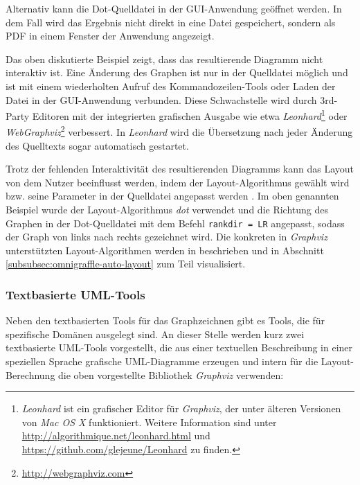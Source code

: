 Alternativ kann die Dot-Quelldatei in der GUI-Anwendung geöffnet werden. In dem Fall wird das Ergebnis nicht direkt in eine Datei gespeichert, sondern als PDF in einem Fenster der Anwendung angezeigt.

Das oben diskutierte Beispiel zeigt, dass das resultierende Diagramm nicht interaktiv ist. Eine Änderung des Graphen ist nur in der Quelldatei möglich und ist mit einem wiederholten Aufruf des Kommandozeilen-Tools oder Laden der Datei in der GUI-An\-wen\-dung verbunden. Diese Schwachstelle wird durch 3rd-Party Editoren mit der integrierten grafischen Ausgabe wie etwa \textit{Leonhard}\footnote{\textit{Leonhard} ist ein grafischer Editor für \textit{Graphviz}, der unter älteren Versionen von \textit{Mac OS X} funktioniert. Weitere Information sind unter \url{http://algorithmique.net/leonhard.html} und \url{https://github.com/glejeune/Leonhard} zu finden.} oder \textit{WebGraphviz}\footnote{\url{http://webgraphviz.com}} verbessert. In \textit{Leonhard} wird die Übersetzung nach jeder Änderung des Quelltexts sogar automatisch gestartet.

Trotz der fehlenden Interaktivität des resultierenden Diagramms kann das Layout von dem Nutzer beeinflusst werden, indem der Layout-Algorithmus gewählt wird bzw. seine Parameter in der Quelldatei angepasst werden \cite{NorthGansner14Dot-Manual}. Im oben genannten Beispiel wurde der Layout-Algorithmus \textit{dot} verwendet und die Richtung des Graphen in der Dot-Quelldatei mit dem Befehl \texttt{rankdir = LR} angepasst, sodass der Graph von links nach rechts gezeichnet wird. Die konkreten in \textit{Graphviz} unterstützten Layout-Algorithmen werden in \cite[S.22]{Gansner14Using} beschrieben und in Abschnitt \ref{subsubsec:omnigraffle-auto-layout} zum Teil visualisiert.

\subsubsection{Textbasierte UML-Tools}

Neben den textbasierten Tools für das Graphzeichnen gibt es Tools, die für spezifische Domänen ausgelegt sind. An dieser Stelle werden kurz zwei textbasierte UML-Tools vorgestellt, die aus einer textuellen Beschreibung in einer speziellen Sprache grafische UML-Diagramme erzeugen und intern für die Layout-Berechnung die oben vorgestellte Bibliothek \textit{Graphviz} verwenden:

